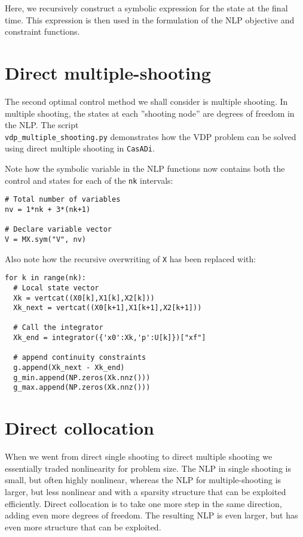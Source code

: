 \documentclass[a4paper,12pt]{book}
\newcommand{\CasADi}{\texttt{CasADi}\xspace}
\begin{document}
Here, we recursively construct a symbolic expression for the state at the final time. This expression is then used in the formulation of the NLP objective and constraint functions.

\section{Direct multiple-shooting}
The second optimal control method we shall consider is multiple shooting. In multiple shooting, the states at each ''shooting node'' are degrees of freedom in the NLP. The script \\ \texttt{vdp\_multiple\_shooting.py} demonstrates how the VDP problem can be solved using direct multiple shooting in \CasADi.

Note how the symbolic variable in the NLP functions now contains both the control and states for each of the \texttt{nk} intervals:
\begin{verbatim}
# Total number of variables
nv = 1*nk + 3*(nk+1)

# Declare variable vector
V = MX.sym("V", nv)
\end{verbatim}

Also note how the recursive overwriting of \texttt{X} has been replaced with:
\begin{verbatim}
for k in range(nk):
  # Local state vector
  Xk = vertcat((X0[k],X1[k],X2[k]))
  Xk_next = vertcat((X0[k+1],X1[k+1],X2[k+1]))

  # Call the integrator
  Xk_end = integrator({'x0':Xk,'p':U[k]})["xf"]

  # append continuity constraints
  g.append(Xk_next - Xk_end)
  g_min.append(NP.zeros(Xk.nnz()))
  g_max.append(NP.zeros(Xk.nnz()))
\end{verbatim}

\section{Direct collocation}
When we went from direct single shooting to direct multiple shooting we essentially traded nonlinearity for problem size. The NLP in single shooting is small, but often highly nonlinear, whereas the NLP for multiple-shooting is larger, but less nonlinear and with a sparsity structure that can be exploited efficiently. Direct collocation is to take one more step in the same direction, adding even more degrees of freedom. The resulting NLP is even larger, but has even more structure that can be exploited.
\end{document}
